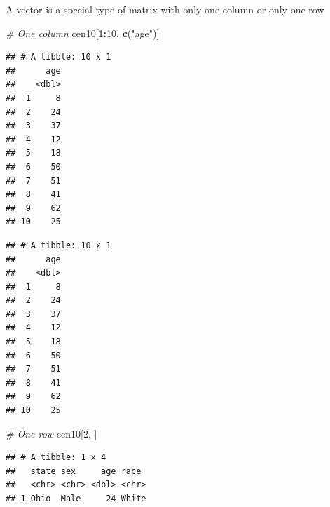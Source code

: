 \documentclass[]{book}
\newenvironment{Shaded}{\begin{snugshade}}{\end{snugshade}}
\newcommand{\KeywordTok}[1]{\textcolor[rgb]{0.13,0.29,0.53}{\textbf{#1}}}
\newcommand{\DecValTok}[1]{\textcolor[rgb]{0.00,0.00,0.81}{#1}}
\newcommand{\StringTok}[1]{\textcolor[rgb]{0.31,0.60,0.02}{#1}}
\newcommand{\CommentTok}[1]{\textcolor[rgb]{0.56,0.35,0.01}{\textit{#1}}}
\newcommand{\OperatorTok}[1]{\textcolor[rgb]{0.81,0.36,0.00}{\textbf{#1}}}
\newcommand{\NormalTok}[1]{#1}
\theoremstyle{definition}
\theoremstyle{definition}
\theoremstyle{definition}
\theoremstyle{remark}
\begin{document}
A vector is a special type of matrix with only one column or only one
row

\begin{Shaded}
\begin{Highlighting}[]
\CommentTok{# One column}
\NormalTok{cen10[}\DecValTok{1}\OperatorTok{:}\DecValTok{10}\NormalTok{, }\KeywordTok{c}\NormalTok{(}\StringTok{"age"}\NormalTok{)]}
\end{Highlighting}
\end{Shaded}

\begin{verbatim}
## # A tibble: 10 x 1
##      age
##    <dbl>
##  1     8
##  2    24
##  3    37
##  4    12
##  5    18
##  6    50
##  7    51
##  8    41
##  9    62
## 10    25
\end{verbatim}

\begin{Shaded}
\end{Shaded}

\begin{verbatim}
## # A tibble: 10 x 1
##      age
##    <dbl>
##  1     8
##  2    24
##  3    37
##  4    12
##  5    18
##  6    50
##  7    51
##  8    41
##  9    62
## 10    25
\end{verbatim}

\begin{Shaded}
\begin{Highlighting}[]
\CommentTok{# One row}
\NormalTok{cen10[}\DecValTok{2}\NormalTok{, ]}
\end{Highlighting}
\end{Shaded}

\begin{verbatim}
## # A tibble: 1 x 4
##   state sex     age race 
##   <chr> <chr> <dbl> <chr>
## 1 Ohio  Male     24 White
\end{verbatim}

\begin{Shaded}
\end{Shaded}
\end{document}
